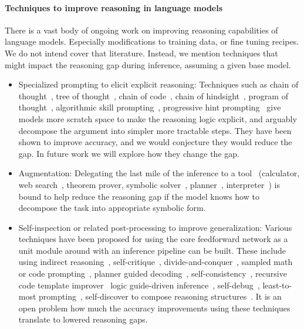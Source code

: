 \documentclass[11pt,a4paper]{article}
\begin{document}
\paragraph{Techniques to improve reasoning in language models}
There is a vast body of ongoing work on improving reasoning capabilities of language models. Especially modifications to training data, or fine tuning recipes. We do not intend cover that literature. Instead, we mention techniques that might impact the reasoning gap during inference, assuming a given base model.
\begin{itemize}
  \item Specialized prompting to elicit explicit reasoning:
      Techniques such as chain of thought~\cite{chain-of-thought},
      tree of thought~\cite{tree-of-thought},
      chain of code~\cite{chain-of-code},
      chain of hindsight~\cite{chain-of-hindsight},
      program of thought~\cite{program-of-thought},
      algorithmic skill prompting~\cite{alg-prompting},
      progressive hint prompting~\cite{progressivehint} give models more
      scratch space to make
      the reasoning logic explicit, and arguably decompose the argument into
      simpler more tractable steps. They have been shown to improve accuracy,
      and we would conjecture they would reduce the gap. In future work we will
      explore how they change the gap.

  \item Augmentation: Delegating the last mile of the inference to a
    tool~\cite{tora, talm} (calculator, web search~\cite{react}, theorem prover,
    symbolic solver~\cite{symbolicai}, planner~\cite{llmp}, interpreter~\cite{pal}) is bound to help
    reduce the reasoning gap if the model
    knows how to decompose the task into appropriate symbolic form.

  \item Self-inspection or related post-processing to improve generalization:
    Various techniques have been proposed for using the core feedforward
    network as a unit module around with an inference pipeline can be built.
    These include using indirect reasoning~\cite{indirect-reasoner},
    self-critique~\cite{self-critique}, divide-and-conquer~\cite{dnc},
    sampled math or code prompting~\cite{math-prompter},
    planner guided decoding~\cite{code-planner-decoding},
    self-consistency~\cite{self-consistency},
    recursive code template improver~\cite{recursive-code-improver}
    logic guide-driven inference~\cite{logic-guide},
    self-debug~\cite{self-debug},
    least-to-most prompting~\cite{least-to-most},
    self-discover to compose reasoning structures~\cite{self-discover}.
    It is
    an open problem how much the accuracy improvements using these techniques
    translate to lowered reasoning gaps.

\end{itemize}
\end{document}
